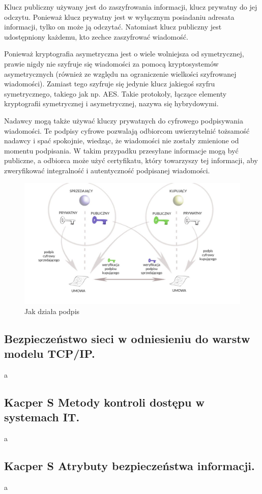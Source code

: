 \documentclass[a4paper,12pt,oneside]{book}
\begin{document}
				Klucz publiczny używany jest do zaszyfrowania informacji, klucz prywatny do jej odczytu. Ponieważ klucz prywatny jest w wyłącznym posiadaniu adresata informacji, tylko on może ją odczytać. Natomiast klucz publiczny jest udostępniony każdemu, kto zechce zaszyfrować wiadomość.
				
				Ponieważ kryptografia asymetryczna jest o wiele wolniejsza od symetrycznej, prawie nigdy nie szyfruje się wiadomości za pomocą kryptosystemów asymetrycznych (również ze względu na ograniczenie wielkości szyfrowanej wiadomości). Zamiast tego szyfruje się jedynie klucz jakiegoś szyfru symetrycznego, takiego jak np. AES. Takie protokoły, łączące elementy kryptografii symetrycznej i asymetrycznej, nazywa się hybrydowymi.
				
				Nadawcy mogą także używać kluczy prywatnych do cyfrowego podpisywania wiadomości. Te podpisy cyfrowe pozwalają odbiorcom uwierzytelnić tożsamość nadawcy i spać spokojnie, wiedząc, że wiadomości nie zostały zmienione od momentu podpisania. W takim przypadku przesyłane informacje mogą być publiczne, a odbiorca może użyć certyfikatu, który towarzyszy tej informacji, aby zweryfikować integralność i autentyczność podpisanej wiadomości.
				
				\begin{figure}[h]
					\centering\includegraphics[scale=0.35]{krypt_asym_podpis.png}
					\caption{Jak działa podpis}
				\end{figure}
				
			\newpage\subsection{\color{red}Bezpieczeństwo sieci w odniesieniu do warstw modelu TCP/IP.}
				a
			\newpage\subsection{\color{green} Kacper S \color{red}Metody kontroli dostępu w systemach IT.}
				a
			\newpage\subsection{\color{green} Kacper S \color{red}Atrybuty bezpieczeństwa informacji.}
				a
	
\end{document}
